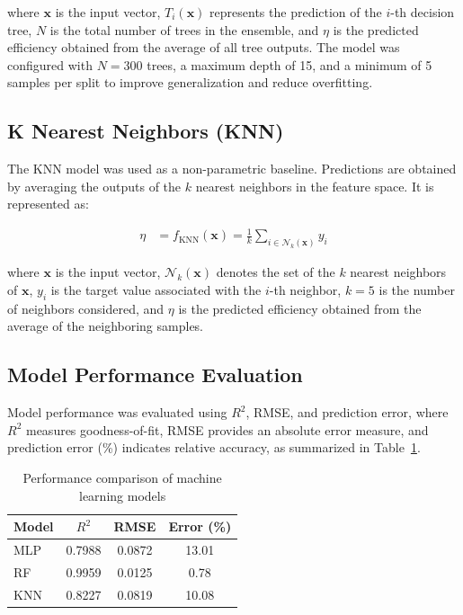 \noindent where $\mathbf{x}$ is the input vector, $T_i(\mathbf{x})$ represents the prediction of the $i$-th decision tree, $N$ is the total number of trees in the ensemble, and $\eta$ is the predicted efficiency obtained from the average of all tree outputs. The model was configured with $N = 300$ trees, a maximum depth of 15, and a minimum of 5 samples per split to improve generalization and reduce overfitting.

\subsection{K Nearest Neighbors (KNN)}

The KNN model was used as a non-parametric baseline. Predictions are obtained by averaging the outputs of the $k$ nearest neighbors in the feature space. It is represented as:

\begin{align}
    \eta &= f_{\mathrm{KNN}}(\mathbf{x}) = \frac{1}{k} \sum_{i \in \mathcal{N}_k(\mathbf{x})} y_i
\end{align}

\noindent where $\mathbf{x}$ is the input vector, $\mathcal{N}_k(\mathbf{x})$ denotes the set of the $k$ nearest neighbors of $\mathbf{x}$, $y_i$ is the target value associated with the $i$-th neighbor, $k = 5$ is the number of neighbors considered, and $\eta$ is the predicted efficiency obtained from the average of the neighboring samples.

\subsection{Model Performance Evaluation}

Model performance was evaluated using $R^2$, RMSE, and prediction error, where $R^2$ measures goodness-of-fit, RMSE provides an absolute error measure, and prediction error (\%) indicates relative accuracy, as summarized in Table~\ref{tab:model_comparison}.

\begin{table}[!htb]
    \centering
    \caption{Performance comparison of machine learning models}
    \label{tab:model_comparison}
    \begin{tabular}{lccc}
        \hline
        Model & $R^2$ & RMSE & Error (\%) \\
        \hline
        MLP & 0.7988 & 0.0872 & 13.01 \\
        RF  & 0.9959 & 0.0125 & 0.78 \\
        KNN & 0.8227 & 0.0819 & 10.08 \\
        \hline
    \end{tabular}
\end{table}

